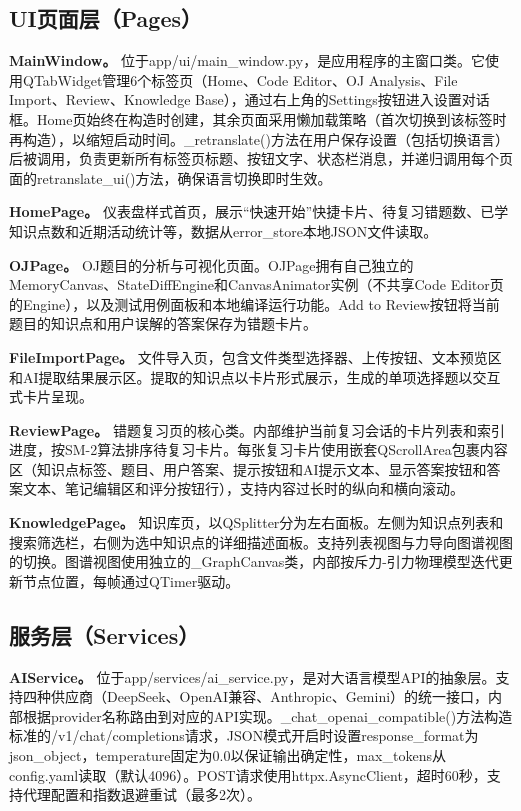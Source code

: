 \documentclass[12pt,a4paper]{ctexart}
\begin{document}
\subsection{UI页面层（Pages）}

\textbf{MainWindow。} 位于app/ui/main\_window.py，是应用程序的主窗口类。它使用QTabWidget管理6个标签页（Home、Code Editor、OJ Analysis、File Import、Review、Knowledge Base），通过右上角的Settings按钮进入设置对话框。Home页始终在构造时创建，其余页面采用懒加载策略（首次切换到该标签时再构造），以缩短启动时间。\_retranslate()方法在用户保存设置（包括切换语言）后被调用，负责更新所有标签页标题、按钮文字、状态栏消息，并递归调用每个页面的retranslate\_ui()方法，确保语言切换即时生效。

\textbf{HomePage。} 仪表盘样式首页，展示“快速开始”快捷卡片、待复习错题数、已学知识点数和近期活动统计等，数据从error\_store本地JSON文件读取。

\textbf{OJPage。} OJ题目的分析与可视化页面。OJPage拥有自己独立的MemoryCanvas、StateDiffEngine和CanvasAnimator实例（不共享Code Editor页的Engine），以及测试用例面板和本地编译运行功能。Add to Review按钮将当前题目的知识点和用户误解的答案保存为错题卡片。

\textbf{FileImportPage。} 文件导入页，包含文件类型选择器、上传按钮、文本预览区和AI提取结果展示区。提取的知识点以卡片形式展示，生成的单项选择题以交互式卡片呈现。

\textbf{ReviewPage。} 错题复习页的核心类。内部维护当前复习会话的卡片列表和索引进度，按SM-2算法排序待复习卡片。每张复习卡片使用嵌套QScrollArea包裹内容区（知识点标签、题目、用户答案、提示按钮和AI提示文本、显示答案按钮和答案文本、笔记编辑区和评分按钮行），支持内容过长时的纵向和横向滚动。

\textbf{KnowledgePage。} 知识库页，以QSplitter分为左右面板。左侧为知识点列表和搜索筛选栏，右侧为选中知识点的详细描述面板。支持列表视图与力导向图谱视图的切换。图谱视图使用独立的\_GraphCanvas类，内部按斥力-引力物理模型迭代更新节点位置，每帧通过QTimer驱动。

\subsection{服务层（Services）}

\textbf{AIService。} 位于app/services/ai\_service.py，是对大语言模型API的抽象层。支持四种供应商（DeepSeek、OpenAI兼容、Anthropic、Gemini）的统一接口，内部根据provider名称路由到对应的API实现。\_chat\_openai\_compatible()方法构造标准的/v1/chat/completions请求，JSON模式开启时设置response\_format为json\_object，temperature固定为0.0以保证输出确定性，max\_tokens从config.yaml读取（默认4096）。POST请求使用httpx.AsyncClient，超时60秒，支持代理配置和指数退避重试（最多2次）。
\end{document}
